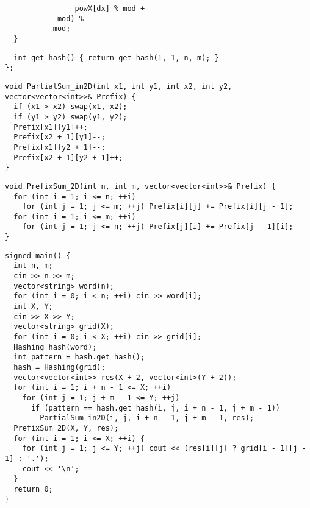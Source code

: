 \documentclass[twoside]{article}
\begin{document}
\begin{multicols*}{2}
\begin{verbatim}
                powX[dx] % mod +
            mod) %
           mod;
  }
\end{verbatim}
\vspace{-12pt}
\begin{verbatim}
  int get_hash() { return get_hash(1, 1, n, m); }
};
\end{verbatim}
\vspace{-12pt}
\begin{verbatim}
void PartialSum_in2D(int x1, int y1, int x2, int y2, vector<vector<int>>& Prefix) {
  if (x1 > x2) swap(x1, x2);
  if (y1 > y2) swap(y1, y2);
  Prefix[x1][y1]++;
  Prefix[x2 + 1][y1]--;
  Prefix[x1][y2 + 1]--;
  Prefix[x2 + 1][y2 + 1]++;
}
\end{verbatim}
\vspace{-12pt}
\begin{verbatim}
void PrefixSum_2D(int n, int m, vector<vector<int>>& Prefix) {
  for (int i = 1; i <= n; ++i)
    for (int j = 1; j <= m; ++j) Prefix[i][j] += Prefix[i][j - 1];
  for (int i = 1; i <= m; ++i)
    for (int j = 1; j <= n; ++j) Prefix[j][i] += Prefix[j - 1][i];
}
\end{verbatim}
\vspace{-12pt}
\begin{verbatim}
signed main() {
  int n, m;
  cin >> n >> m;
  vector<string> word(n);
  for (int i = 0; i < n; ++i) cin >> word[i];
  int X, Y;
  cin >> X >> Y;
  vector<string> grid(X);
  for (int i = 0; i < X; ++i) cin >> grid[i];
  Hashing hash(word);
  int pattern = hash.get_hash();
  hash = Hashing(grid);
  vector<vector<int>> res(X + 2, vector<int>(Y + 2));
  for (int i = 1; i + n - 1 <= X; ++i)
    for (int j = 1; j + m - 1 <= Y; ++j)
      if (pattern == hash.get_hash(i, j, i + n - 1, j + m - 1))
        PartialSum_in2D(i, j, i + n - 1, j + m - 1, res);
  PrefixSum_2D(X, Y, res);
  for (int i = 1; i <= X; ++i) {
    for (int j = 1; j <= Y; ++j) cout << (res[i][j] ? grid[i - 1][j - 1] : '.');
    cout << '\n';
  }
  return 0;
}
\end{verbatim}

{
}
\end{multicols*}
\end{document}
